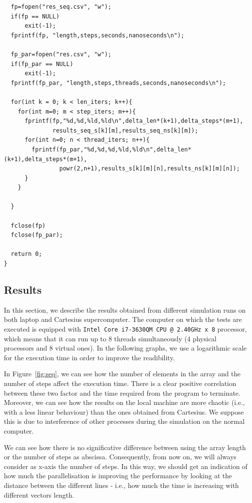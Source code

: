 \documentclass[a4paper]{article}
\begin{document}
\begin{verbatim}
  fp=fopen("res_seq.csv", "w");
  if(fp == NULL)
      exit(-1);
  fprintf(fp, "length,steps,seconds,nanoseconds\n");

  fp_par=fopen("res.csv", "w");
  if(fp_par == NULL)
      exit(-1);
  fprintf(fp_par, "length,steps,threads,seconds,nanoseconds\n");

  for(int k = 0; k < len_iters; k++){
    for(int m=0; m < step_iters; m++){
      fprintf(fp,"%d,%d,%ld,%ld\n",delta_len*(k+1),delta_steps*(m+1),
              results_seq_s[k][m],results_seq_ns[k][m]);
      for(int n=0; n < thread_iters; n++){
        fprintf(fp_par,"%d,%d,%d,%ld,%ld\n",delta_len*(k+1),delta_steps*(m+1),
                powr(2,n+1),results_s[k][m][n],results_ns[k][m][n]);
      }
    }

  }

  fclose(fp)
  fclose(fp_par);

  return 0;
}
\end{verbatim}

\newpage

\subsection{Results}

In this section, we describe the results obtained from different simulation runs on both laptop and Cartesius supercomputer. The computer on which the tests are executed is equipped with \texttt{Intel Core i7-3630QM CPU @ 2.40GHz x 8} processor, which means that it can run up to 8 threads simultaneously (4 physical processors and 8 virtual ones). In the following graphs, we use a logarithmic scale for the execution time in order to improve the readibility.

In Figure~\ref{fig:seq}, we can see how the number of elements in the array and the number of steps affect the execution time. There is a clear positive correlation between these two factor and the time required from the program to terminate. Moreover, we can see how the results on the local machine are more chaotic (i.e., with a less linear behaviour) than the ones obtained from Cartesius. We suppose this is due to interference of other processes during the simulation on the normal computer.

We can see how there is no significative difference between using the array length or the number of steps as abscissa. Consequently, from now on, we will always consider as x-axis the number of steps. In this way, we should get an indication of how much the parallelisation is improving the performance by looking at the distance between the different lines - i.e., how much the time is increasing with different vectors length.  
\end{document}
